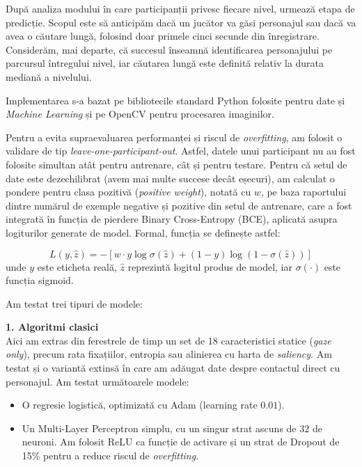 După analiza modului în care participanții privesc fiecare nivel, urmează etapa de predicție. Scopul este să anticipăm dacă un jucător va găsi personajul sau dacă va avea o căutare lungă, folosind doar primele cinci secunde din înregistrare. Considerăm, mai departe, că succesul înseamnă identificarea personajului pe parcursul întregului nivel, iar căutarea lungă este definită relativ la durata mediană a nivelului.

Implementarea s-a bazat pe bibliotecile standard Python folosite pentru date și \emph{Machine Learning} \cite{harris2020numpy,hunter2007matplotlib,mckinney2010pandas,paszke2019pytorch,pedregosa2011scikit,seabold2010statsmodels,virtanen2020scipy,waskom2021seaborn} și pe OpenCV \cite{bradski2000opencv} pentru procesarea imaginilor.

Pentru a evita supraevaluarea performanței și riscul de \emph{overfitting}, am folosit o validare de tip \emph{leave-one-participant-out}. Astfel, datele unui participant nu au fost folosite simultan atât pentru antrenare, cât și pentru testare. Pentru că setul de date este dezechilibrat (avem mai multe succese decât eșecuri), am calculat o pondere pentru clasa pozitivă (\emph{positive weight}), notată cu $w$, pe baza raportului dintre numărul de exemple negative și pozitive din setul de antrenare, care a fost integrată în funcția de pierdere Binary Cross-Entropy (BCE), aplicată asupra logiturilor generate de model. Formal, funcția se definește astfel:

\[
L(y,\hat{z}) = - \left[ w \cdot y \log \sigma(\hat{z}) + (1-y)\log(1-\sigma(\hat{z})) \right]
\]
unde $y$ este eticheta reală, $\hat{z}$ reprezintă logitul produs de model, iar $\sigma(\cdot)$ este funcția sigmoid.

Am testat trei tipuri de modele:

\textbf{1. Algoritmi clasici} \\
Aici am extras din ferestrele de timp un set de 18 caracteristici statice (\emph{gaze only}), precum rata fixațiilor, entropia sau alinierea cu harta de \emph{saliency}. Am testat și o variantă extinsă în care am adăugat date despre contactul direct cu personajul. Am testat următoarele modele:
\begin{itemize}
	\item O regresie logistică, optimizată cu Adam (learning rate $0.01$).
	\item Un Multi-Layer Perceptron simplu, cu un singur strat ascuns de 32 de neuroni. Am folosit ReLU ca funcție de activare și un strat de Dropout de 15\% pentru a reduce riscul de \emph{overfitting}.
\end{itemize}

